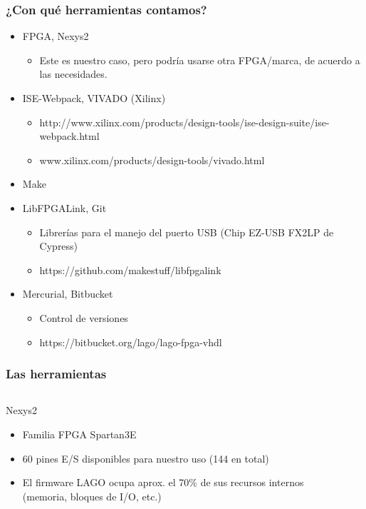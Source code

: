 \documentclass{beamer}
\begin{document}
\begin{frame}
  \frametitle{¿Con qué herramientas contamos?}
  \begin{block}{}
    \begin{itemize}
      \item  FPGA, Nexys2
        \begin{itemize}
          \item Este es nuestro caso, pero podría usarse otra
                FPGA/marca, de acuerdo a las necesidades.
        \end{itemize}
      \item  ISE-Webpack, VIVADO (Xilinx)
      \begin{itemize}
        \item
http://www.xilinx.com/products/design-tools/ise-design-suite/ise-webpack.html
        \item www.xilinx.com/products/design-tools/vivado.html
      \end{itemize}
      \item  Make
      \item  LibFPGALink, Git
      \begin{itemize}
        \item Librerías para el manejo del puerto USB (Chip EZ-USB FX2LP de
							Cypress)
        \item https://github.com/makestuff/libfpgalink
      \end{itemize}
      \item  Mercurial, Bitbucket
      \begin{itemize}
        \item Control de versiones
        \item https://bitbucket.org/lago/lago-fpga-vhdl
      \end{itemize}
    \end{itemize}
\end{block}
\end{frame}

\begin{frame}
\frametitle{Las herramientas}
  \begin{columns}
    \begin{column}{0.45\textwidth}
      \begin{block}{Nexys2}
        \begin{itemize}
          \item  Familia FPGA Spartan3E
          \item  60 pines E/S disponibles para nuestro uso (144 en total)
          \item  El firmware LAGO ocupa aprox. el 70\% de sus recursos internos
                 (memoria, bloques de I/O, etc.)
        \end{itemize}
      \end{block}
    \end{column} 
    \begin{column}{0.65\textwidth}
    \end{column}
  \end{columns}
\end{frame}
\end{document}
